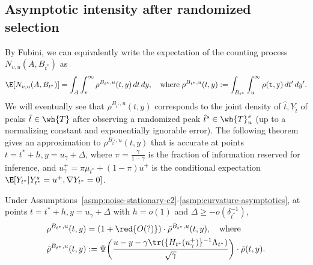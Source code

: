 \documentclass{article}
\begin{document}
	\subsection{Asymptotic intensity after randomized selection}
	By Fubini, we can equivalently write the expectation of the counting process $N_{v,u}(A,B_{t^*})$ as 
	\begin{equation*}
		\E[N_{v,u}(A,B_{t^*})] = \int_{A} \int_{v}^{\infty} \rho^{B_{t^*},u}(t,y) \,dt \,dy, \quad {\rm where} \; \rho^{B_{t^*},u}(t,y) := \int_{B_{t^*}} \int_{u}^{\infty} \rho({\tt t},{\tt y}) \,dt' \,dy'.
	\end{equation*}
	We will eventually see that $\rho^{B_{t^*},u}(t,y)$ corresponds to the joint density of $\hat{t},Y_{\hat{t}}$ of peaks $\hat{t} \in \wh{T}$ after observing a randomized peak $\hat{t}^s \in \wh{T}_u^s$ (up to a normalizing constant and exponentially ignorable error). The following theorem gives an approximation to $\rho^{B_{t^*},u}(t,y)$ that is accurate at points $t = t^* + h, y = u_{\gamma} + \Delta$, where $\pi = \frac{\gamma}{1 - \gamma}$ is the fraction of information reserved for inference, and $u_{\gamma}^{+} = \pi \mu_{t^*} + (1 - \pi) u^{+}$ is the conditional expectation $\E[Y_{t^*}|Y_{t^*}^s = u^{+},\nabla Y_{t^*} = 0]$. 
	\begin{theorem}
		\label{thm:approximate-randomized-joint-intensity}
		Under Assumptions~\ref{asmp:noise-stationary-c2}-\ref{asmp:curvature-asymptotics}, at points $t = t^* + h, y = u_{\gamma} + \Delta$ with $h = o(1)$ and $\Delta \geq - o(\delta_{t^*}^{-1})$,
		\begin{equation*}
		\begin{aligned}
			\rho^{B_{t^*},u}(t,y) 
			& = (1 + \red{O(?)}) \cdot \bar{\rho}^{B_{t^*},u}(t,y), \quad {\rm where} \\
			\bar{\rho}^{B_{t^*},u}(t,y)
			& := \Psi\bigg(\frac{u - y - \gamma\tr(\{H_{t^*}(u_{\gamma}^{+})\}^{-1}\Lambda_{t^*})}{\sqrt{\gamma}}\bigg) \cdot \bar{\rho}(t,y).
		\end{aligned}
		\end{equation*}
	\end{theorem}
\end{document}
